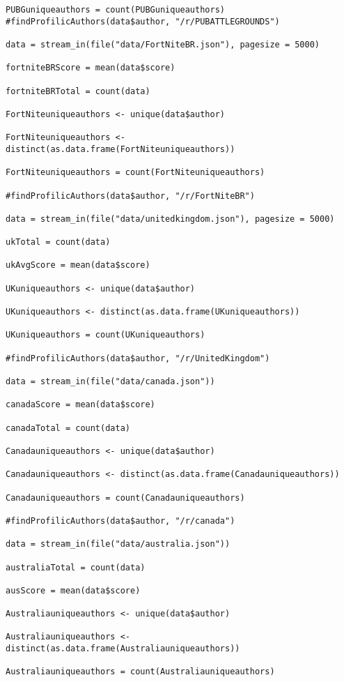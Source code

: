 \begin{lstlisting}
PUBGuniqueauthors = count(PUBGuniqueauthors)
#findProfilicAuthors(data$author, "/r/PUBATTLEGROUNDS")

data = stream_in(file("data/FortNiteBR.json"), pagesize = 5000)

fortniteBRScore = mean(data$score)

fortniteBRTotal = count(data)

FortNiteuniqueauthors <- unique(data$author)

FortNiteuniqueauthors <- distinct(as.data.frame(FortNiteuniqueauthors))

FortNiteuniqueauthors = count(FortNiteuniqueauthors)

#findProfilicAuthors(data$author, "/r/FortNiteBR")

data = stream_in(file("data/unitedkingdom.json"), pagesize = 5000)

ukTotal = count(data)

ukAvgScore = mean(data$score)

UKuniqueauthors <- unique(data$author)

UKuniqueauthors <- distinct(as.data.frame(UKuniqueauthors))

UKuniqueauthors = count(UKuniqueauthors)

#findProfilicAuthors(data$author, "/r/UnitedKingdom")

data = stream_in(file("data/canada.json"))

canadaScore = mean(data$score)

canadaTotal = count(data)

Canadauniqueauthors <- unique(data$author)

Canadauniqueauthors <- distinct(as.data.frame(Canadauniqueauthors))

Canadauniqueauthors = count(Canadauniqueauthors)

#findProfilicAuthors(data$author, "/r/canada")

data = stream_in(file("data/australia.json"))

australiaTotal = count(data)

ausScore = mean(data$score)

Australiauniqueauthors <- unique(data$author)

Australiauniqueauthors <- distinct(as.data.frame(Australiauniqueauthors))

Australiauniqueauthors = count(Australiauniqueauthors)


\end{lstlisting}
